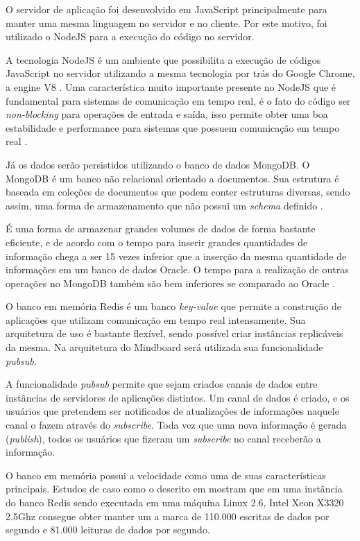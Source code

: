 O servidor de aplicação foi desenvolvido em JavaScript principalmente para manter uma mesma linguagem no servidor e no cliente. Por este motivo, foi utilizado o NodeJS para a execução do código no servidor.

A tecnologia NodeJS é um ambiente que possibilita a execução de códigos JavaScript no servidor utilizando a mesma tecnologia por trás do Google Chrome, a engine V8 \cite{nodejs}. Uma característica muito importante presente no NodeJS que é fundamental para sistemas de comunicação em tempo real, é o fato do código ser \emph{non-blocking} para operações de entrada e saída, isso permite obter uma boa estabilidade e performance para sistemas que possuem comunicação em tempo real \cite{nodejs}.

Já os dados serão persistidos utilizando o banco de dados MongoDB. O MongoDB é um banco não relacional orientado a documentos. Sua estrutura é baseada em coleções de documentos que podem conter estruturas diversas, sendo assim, uma forma de armazenamento que não possui um \emph{schema} definido \cite{mongodb}. 

É uma forma de armazenar grandes volumes de dados de forma bastante eficiente, e de acordo com \cite{mongodb} o tempo para inserir grandes quantidades de informação chega a ser 15 vezes inferior que a inserção da mesma quantidade de informações em um banco de dados Oracle. O tempo para a realização de outras operações no MongoDB também são bem inferiores se comparado ao Oracle \cite{mongodb}.

O banco em memória Redis \cite{redis_site} é um banco \emph{key-value} que permite a construção de aplicações que utilizam comunicação em tempo real intensamente. Sua arquitetura de uso é bastante flexível, sendo possível criar instâncias replicáveis da mesma. Na arquitetura do Mindboard será utilizada sua funcionalidade \emph{pubsub}.

A funcionalidade \emph{pubsub} \cite{redis_pubsub} permite que sejam criados canais de dados entre instâncias de servidores de aplicações distintos. Um canal de dados é criado, e os usuários que pretendem ser notificados de atualizações de informações naquele canal o fazem através do \emph{subscribe}. Toda vez que uma nova informação é gerada (\emph{publish}), todos os usuários que fizeram um \emph{subscribe} no canal receberão a informação.


O banco em memória possui a velocidade como uma de suas características principais. Estudos de caso como o descrito em \cite{redis_perf} mostram que em uma instância do banco Redis sendo executada em uma máquina Linux 2.6, Intel Xeon X3320 2.5Ghz consegue obter manter um a marca de 110.000 escritas de dados por segundo e 81.000 leituras de dados por segundo.

